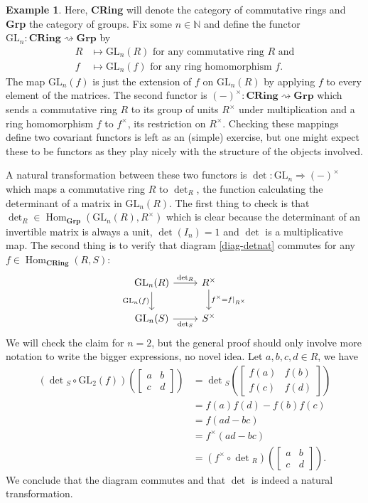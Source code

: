 \documentclass{article}
\theoremstyle{definition}
\newtheorem{exmp}[thm]{Example}
\theoremstyle{remark}
\newcommand{\N}{\mathbb{N}}
\DeclareMathOperator{\Hom}{Hom}
\newcommand{\gln}{\text{GL}_n}
\begin{document}
\begin{exmp}
	Here, \textbf{CRing} will denote the category of commutative rings and \textbf{Grp} the category of groups. Fix some $n \in \N$ and define the functor $\gln:\textbf{CRing} \rightsquigarrow \textbf{Grp}$ by 
	\begin{align*}
	R &\mapsto \gln(R) \mbox{ for any commutative ring $R$ and} \\
	f &\mapsto \gln(f) \mbox{ for any ring homomorphism $f$.}
	\end{align*}
	The map $\gln(f)$ is just the extension of $f$ on $\gln(R)$ by applying $f$ to every element of the matrices. The second functor is $(-)^{\times}:\textbf{CRing} \rightsquigarrow \textbf{Grp}$ which sends a commutative ring $R$ to its group of units $R^{\times}$ under multiplication and a ring homomorphism $f$ to $f^{\times}$, its restriction on $R^{\times}$. Checking these mappings define two covariant functors is left as an (simple) exercise, but one might expect these to be functors as they play nicely with the structure of the objects involved.
	
	A natural transformation between these two functors is $\det:\gln \Rightarrow (-)^{\times}$ which maps a commutative ring $R$ to $\det_R$, the function calculating the determinant of a matrix in $\gln(R)$. The first thing to check is that $\det_R \in \Hom_{\textbf{Grp}}(\gln(R), R^{\times})$ which is clear because the determinant of an invertible matrix is always a unit, $\det(I_n) = 1$ and $\det$ is a multiplicative map. The second thing is to verify that diagram \eqref{diag-detnat} commutes for any $f\in \Hom_{\textbf{CRing}}(R,S)$:
	\begin{equation}\label{diag-detnat}
	\begin{tikzcd}
	\text{GL}_n(R) \arrow[r, "\det_R"] \arrow[d, "\text{GL}_n(f)"'] & R^{\times} \arrow[d, "f^{\times} = f\mid_{R^{\times}}"] \\
	\text{GL}_n(S) \arrow[r, "\det_S"'] & S^{\times}
	\end{tikzcd}
	\end{equation}
	We will check the claim for $n=2$, but the general proof should only involve more notation to write the bigger expressions, no novel idea. Let $a,b,c,d \in R$, we have 
	\begin{align*}
	(\det{}_S \circ \text{GL}_2(f))\left( \begin{bmatrix}a&b\\c&d\end{bmatrix} \right)&= 
	\det{}_S\left(\begin{bmatrix}f(a)&f(b)\\f(c)&f(d)\end{bmatrix}\right)\\
	&= f(a)f(d)-f(b)f(c)\\
	&= f(ad-bc)\\
	&= f^{\times}(ad-bc)\\
	&= (f^{\times}\circ \det{}_R)\left( \begin{bmatrix}a&b\\c&d\end{bmatrix}\right).
	\end{align*}
	We conclude that the diagram commutes and that $\det$ is indeed a natural transformation.
\end{exmp}
\end{document}
